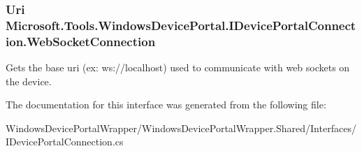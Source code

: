\subsubsection[{\texorpdfstring{Web\+Socket\+Connection}{WebSocketConnection}}]{\setlength{\rightskip}{0pt plus 5cm}Uri Microsoft.\+Tools.\+Windows\+Device\+Portal.\+I\+Device\+Portal\+Connection.\+Web\+Socket\+Connection\hspace{0.3cm}{\ttfamily [get]}}\hypertarget{interface_microsoft_1_1_tools_1_1_windows_device_portal_1_1_i_device_portal_connection_aed3a7ffef88f50ce557d8821e82e30a7}{}\label{interface_microsoft_1_1_tools_1_1_windows_device_portal_1_1_i_device_portal_connection_aed3a7ffef88f50ce557d8821e82e30a7}


Gets the base uri (ex\+: ws\+://localhost) used to communicate with web sockets on the device. 



The documentation for this interface was generated from the following file\+:\begin{DoxyCompactItemize}
\item 
Windows\+Device\+Portal\+Wrapper/\+Windows\+Device\+Portal\+Wrapper.\+Shared/\+Interfaces/I\+Device\+Portal\+Connection.\+cs\end{DoxyCompactItemize}
